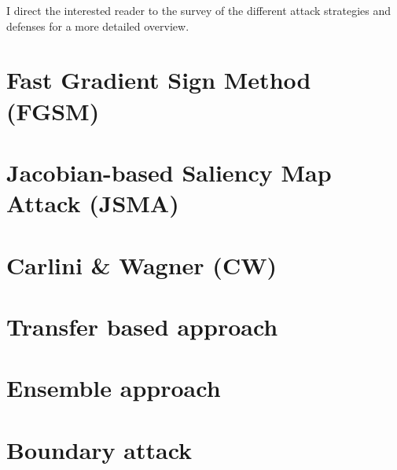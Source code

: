 I direct the interested reader to the survey \cite{survey} of the different attack strategies and defenses for a more detailed overview.

\section{Fast Gradient Sign Method (FGSM)}
\label{sec:FGSM}



\section{Jacobian-based Saliency Map Attack (JSMA)}
\label{sec:JSMA}


 
\section{Carlini \& Wagner (CW)}
\label{sec:CW}



\section{Transfer based approach}
\label{sec:transfer-based}



\section{Ensemble approach} 
\label{sec:ensemble-approach}



\section{Boundary attack}
\label{sec:boundary-attack}

